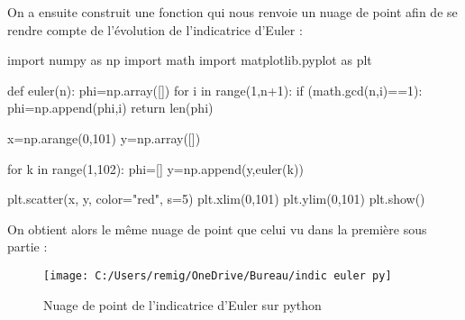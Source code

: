 \documentclass[12pt]{article}
\begin{document}
On a ensuite construit une fonction qui nous renvoie un nuage de point afin de se rendre compte de l'évolution de l'indicatrice d'Euler :
\begin{python}
import numpy as np
import math
import matplotlib.pyplot as plt



def euler(n):
    phi=np.array([])
    for i in range(1,n+1):
        if (math.gcd(n,i)==1):
            phi=np.append(phi,i)
    return len(phi)

x=np.arange(0,101)
y=np.array([])


for k in range(1,102):
    phi=[]
    y=np.append(y,euler(k))


plt.scatter(x, y, color="red", s=5)
plt.xlim(0,101)
plt.ylim(0,101)
plt.show()
\end{python}
On obtient alors le même nuage de point que celui vu dans la première sous partie :

\begin{figure}[h]
	\texttt{[image: C:/Users/remig/OneDrive/Bureau/indic euler py]}
	\centering
	\caption{Nuage de point de l'indicatrice d'Euler sur python}
\end{figure}
\end{document}
